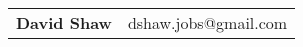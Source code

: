\documentclass[letterpaper,11pt]{article}
\makeatletter
\newcommand{\resitem}[1]{\item #1 \vspace{-2pt}}
\newcommand{\resheading}[1]{{\large \colorbox{mygrey}{\begin{minipage}{\textwidth}{\textbf{#1 \vphantom{p\^{E}}}}\end{minipage}}}}
\newcommand{\ressubheading}[4]{
\begin{tabular*}{6.5in}{l@{\extracolsep{\fill}}r}
		\textbf{#1} & #2 \\
		\textit{#3} & \textit{#4} \\
\end{tabular*}\vspace{-6pt}}
\makeatother
\begin{document}
\thispagestyle{empty}
\newcommand{\mywebheader}{
\begin{tabular*}{7in}{l@{\extracolsep{\fill}}r}
	\textbf{{\LARGE David Shaw}} & {dshaw.jobs@gmail.com}
	\end{tabular*}
\\
\vspace{0.1in}}

\mywebheader

\end{document}
